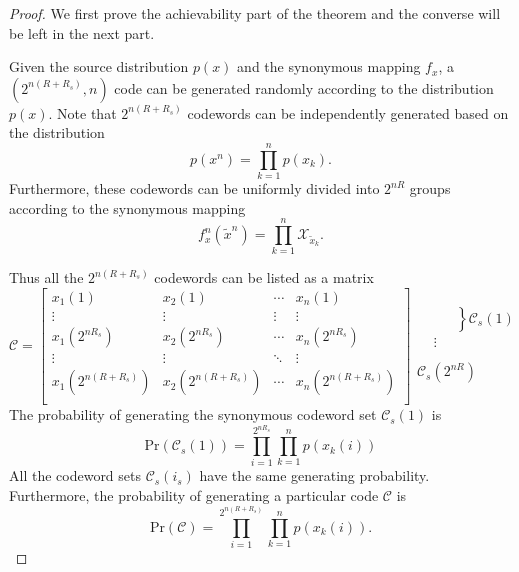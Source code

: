 \documentclass[12pt, draftclsnofoot,onecolumn]{IEEEtran}
\begin{document}
\begin{proof}
We first prove the achievability part of the theorem and the converse will be left in the next part.

Given the source distribution $p(x)$ and the synonymous mapping $f_x$, a $\left(2^{n{(R+R_s)}},n\right)$ code can be generated randomly according to the distribution $p(x)$. Note that $2^{n{(R+R_s)}}$ codewords can be independently generated based on the distribution
\begin{equation}
p(x^n)=\prod_{k=1}^{n} p(x_k).
\end{equation}
Furthermore, these codewords can be uniformly divided into $2^{nR}$ groups according to the synonymous mapping
\begin{equation}
f_x^n(\tilde{x}^n)=\prod_{k=1}^{n} \mathcal{X}_{\tilde{x}_k}.
\end{equation}

Thus all the $2^{n{(R+R_s)}}$ codewords can be listed as a matrix
\begin{equation}
\mathcal{C}=\left[ \begin{matrix}
   {{x}_{1}}(1) & {{x}_{2}}(1) & \cdots  & {{x}_{n}}(1)  \\
   \vdots  & \vdots  & \vdots  & \vdots   \\
   {{x}_{1}}({{2}^{n{{R}_{s}}}}) & {{x}_{2}}({{2}^{n{{R}_{s}}}}) & \cdots  & {{x}_{n}}({{2}^{n{{R}_{s}}}})  \\
   \vdots  & \vdots  & \ddots  & \vdots   \\
   {{x}_{1}}({{2}^{n(R+R_s)}}) & {{x}_{2}}({{2}^{n(R+R_s)}}) & \cdots  & {{x}_{n}}({{2}^{n(R+R_s)}})  \\
\end{matrix} \right]
  \begin{matrix}
   \begin{aligned}
   & \left.
     \begin{aligned}
   &  \\
   &  \\
   &  \\
  \end{aligned} \right\}{{\mathcal{C}}_{s}}(1) \\
     & \vdots  \\
   \end{aligned}  \\
   {{\mathcal{C}}_{s}}({{2}^{n{{R}}}})  \\
\end{matrix}
\end{equation}
The probability of generating the synonymous codeword set $\mathcal{C}_s(1)$ is
\begin{equation}
\text{Pr}\left(\mathcal{C}_s(1)\right)=\prod_{i=1}^{2^{nR_s}}\prod_{k=1}^{n} p(x_k(i))
\end{equation}
All the codeword sets $\mathcal{C}_s(i_s)$ have the same generating probability. Furthermore, the probability of generating a particular code $\mathcal{C}$ is
\begin{equation}
\text{Pr}\left(\mathcal{C}\right)=\prod_{i=1}^{2^{n(R+R_s)}}\prod_{k=1}^{n} p(x_k(i)).
\end{equation}


\end{proof}
\end{document}
